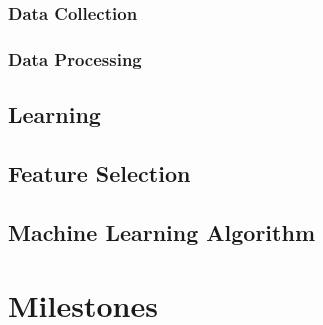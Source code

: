 \documentclass[paper=a4, fontsize=11pt]{scrartcl}
\numberwithin{equation}{section}    %
\numberwithin{figure}{section}      %
\numberwithin{table}{section}       %
\numberwithin{equation}{section}    %
\numberwithin{figure}{section}      %
\numberwithin{table}{section}       %
\begin{document}
\subsubsection{Data Collection}

\subsubsection{Data Processing}



\subsection{Learning}

\subsection{Feature Selection}

\subsection{Machine Learning Algorithm}

\section{Milestones}

\subsection{}


\begin{thebibliography}{1}


\end{thebibliography}
\end{document}
